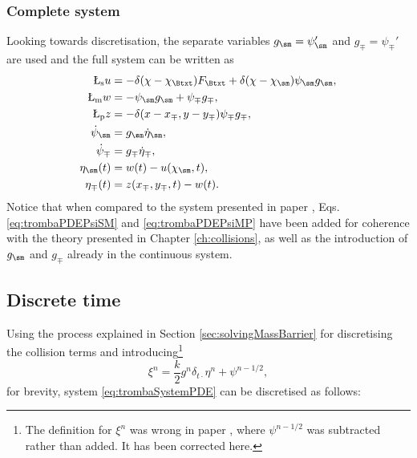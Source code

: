 \subsubsection{Complete system}
Looking towards discretisation, the separate variables $g_\sm=\psi_\sm'$ and $g_\mp=\psi_\mp'$ are used and the full system can be written as 
\begin{subequations}\label{eq:trombaSystemPDE}
    \begin{align}
        \L_\text{s}u &= -\delta(\chi-\chi_\Btxt)F_\Btxt + \delta(\chi - \chi_\sm)\psi_\sm g_\sm,\\
        \L_\text{m}w &= - \psi_\sm g_\sm + \psi_\mp g_\mp,\\
        \L_\text{p}z &= -\delta(x-x_\mp, y-y_\mp)\psi_\mp g_\mp,\\
        \dot\psi_\sm &= g_\sm \dot \eta_\sm,\label{eq:trombaPDEPsiSM}\\
        \dot\psi_\mp &= g_\mp \dot \eta_\mp,\label{eq:trombaPDEPsiMP}\\
        \eta_\sm(t) &= w(t) - u(\chi_\sm, t),\\
        \eta_\mp(t) &= z(x_\mp, y_\mp, t) - w(t).
    \end{align}
\end{subequations}
Notice that when compared to the system presented in paper \citeP[D], Eqs. \eqref{eq:trombaPDEPsiSM} and \eqref{eq:trombaPDEPsiMP} have been added for coherence with the theory presented in Chapter \ref{ch:collisions}, as well as the introduction of $g_\sm$ and $g_\mp$ already in the continuous system.


\subsection{Discrete time}
Using the process explained in Section \ref{sec:solvingMassBarrier} for discretising the collision terms and introducing\footnote{The definition for $\xi^n$ was wrong in paper \citeP[D], where $\psi^{n-1/2}$ was subtracted rather than added. It has been corrected here.} 
\begin{equation}
    \xi^n = \frac{k}{2}g^n\delta_{t\cdot}\eta^n + \psi^{n-1/2},
\end{equation}
for brevity, system \eqref{eq:trombaSystemPDE} can be discretised as follows:

